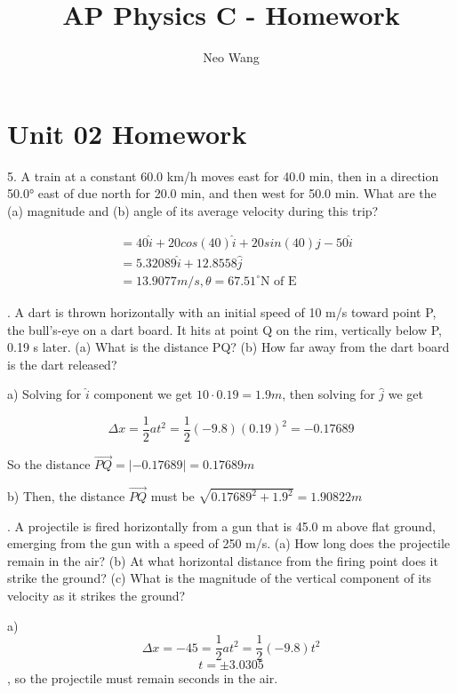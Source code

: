 \documentclass{scrreprt} %
\title{AP Physics C - Homework}
\author{Neo Wang}
\begin{document}
\section{Unit 02 Homework}

5. A train at a constant 60.0 km/h moves east for 40.0 min,
then  in  a  direction  50.0° east  of  due  north  for  20.0 min, and  then
west for 50.0 min. What are the (a) magnitude and (b) angle of its
average velocity during this trip?

\begin{align*}
	&= 40\hat{i} + 20cos(40)\hat{i} + 20sin(40)\hat{j} - 50 \hat{i} \\
	&= 5.32089\hat{i} + 12.8558\hat{j} \\
	&= \boxed{13.9077 m/s, \theta = 67.51^\circ \textrm{N of E}}
\end{align*}


. A dart is thrown horizontally with an initial speed of 
10 m/s  toward  point  P, the  bull’s-eye  on  a  dart  board. It  hits  at
point Q on the rim, vertically below P, 0.19 s later. (a) What is the
distance PQ?  (b)  How  far  away  from  the  dart  board  is  the  dart
released? \newline

a) Solving for $\hat{i}$ component we get $10\cdot 0.19 = 1.9 m$, then solving
for $\hat{j}$ we get

$$\Delta x = \frac{1}{2}at^2 = \frac{1}{2}(-9.8)(0.19)^2=-0.17689$$

So the distance $\vec{PQ} = |-0.17689| = \boxed{0.17689 m}$

b) Then, the distance $\vec{PQ}$ must be $\sqrt{0.17689^2 + 1.9^2} = \boxed{1.90822 m}$\newline

. A projectile is fired horizontally from a gun that is 
45.0 m above flat ground, emerging from the gun with a speed of
250 m/s. (a) How long does the projectile remain in the air? (b) At
what  horizontal  distance  from  the  firing  point  does  it  strike  the
ground? (c) What is the magnitude of the vertical component of its
velocity as it strikes the ground? \newline

a) $$\Delta x = -45 = \frac{1}{2}at^2 = \frac{1}{2}(-9.8)t^2$$
$$t = \pm 3.0305$$, so the projectile must remain  seconds in the air.
\end{document}

